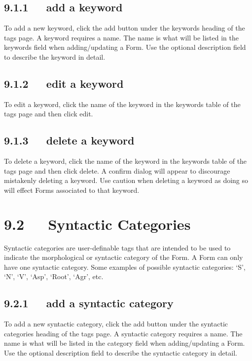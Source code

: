 \documentclass[letterpaper,10pt,english]{sphinxmanual}
\begin{document}
\subsection{9.1.1   add a keyword}
\label{documentation:add-a-keyword}
To add a new keyword, click the add button under the keywords heading of the
tags page.  A keyword requires a name.  The name is what will be listed in the
keywords field when adding/updating a Form.  Use the optional description field
to describe the keyword in detail.


\subsection{9.1.2   edit a keyword}
\label{documentation:edit-a-keyword}
To edit a keyword, click the name of the keyword in the keywords table of the
tags page and then click edit.


\subsection{9.1.3   delete a keyword}
\label{documentation:delete-a-keyword}
To delete a keyword, click the name of the keyword in the keywords table of the
tags page and then click delete.  A confirm dialog will appear to discourage
mistakenly deleting a keyword.  Use caution when deleting a keyword as doing
so will effect Forms associated to that keyword.


\section{9.2   Syntactic Categories}
\label{documentation:syntactic-categories}
Syntactic categories are user-definable tags that are intended to be used to
indicate the morphological or syntactic category of the Form.  A Form can only
have one syntactic category.  Some examples of possible syntactic categories:
`S', `N', `V', `Asp', `Root', `Agr', etc.


\subsection{9.2.1   add a syntactic category}
\label{documentation:add-a-syntactic-category}
To add a new syntactic category, click the add button under the syntactic
categories heading of the tags page.  A syntactic category requires a name.  The
name is what will be listed in the category field when adding/updating a Form.
Use the optional description field to describe the syntactic category in detail.
\end{document}
